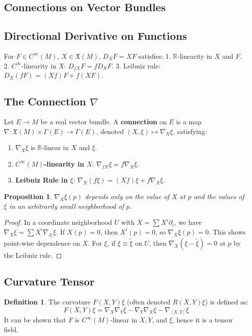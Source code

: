 \documentclass[11pt, a4paper]{article}
\theoremstyle{plain}
\newtheorem{proposition}[theorem]{Proposition}
\theoremstyle{definition}
\newtheorem{definition}[theorem]{Definition}
\theoremstyle{remark}
\begin{document}
\subsection{Connections on Vector Bundles}

\subsection*{Directional Derivative on Functions}
For $F \in C^\infty(M)$, $X \in \mathfrak{X}(M)$, $D_X F = XF$ satisfies:
1. $\mathbb{R}$-linearity in $X$ and $F$.
2. $C^\infty$-linearity in $X$: $D_{fX} F = f D_X F$.
3. Leibniz rule: $D_X(fF) = (Xf)F + f(XF)$.

\subsection*{The Connection $\nabla$}
Let $E \to M$ be a real vector bundle. A \textbf{connection} on $E$ is a map $\nabla: \mathfrak{X}(M) \times \Gamma(E) \to \Gamma(E)$, denoted $(X, \xi) \mapsto \nabla_X \xi$, satisfying:
\begin{enumerate}
    \item $\nabla_X \xi$ is $\mathbb{R}$-linear in $X$ and $\xi$.
    \item \textbf{$C^\infty(M)$-linearity in $X$}: $\nabla_{fX} \xi = f \nabla_X \xi$.
    \item \textbf{Leibniz Rule in $\xi$}: $\nabla_X(f\xi) = (Xf)\xi + f \nabla_X \xi$.
\end{enumerate}

\begin{proposition}
$\nabla_X \xi (p)$ depends only on the value of $X$ at $p$ and the values of $\xi$ in an arbitrarily small neighborhood of $p$.
\end{proposition}

\begin{proof}
In a coordinate neighborhood $U$ with $X = \sum X^i \partial_i$, we have $\nabla_X \xi = \sum X^i \nabla_{\partial_i} \xi$. If $X(p)=0$, then $X^i(p)=0$, so $\nabla_X \xi(p) = 0$. This shows point-wise dependence on $X$. For $\xi$, if $\xi \equiv \tilde{\xi}$ on $U$, then $\nabla_X (\xi - \tilde{\xi}) = 0$ at $p$ by the Leibniz rule.
\end{proof}

\subsection*{Curvature Tensor}
\begin{definition}
The curvature $F(X, Y)\xi$ (often denoted $R(X, Y)\xi$) is defined as:
\[ F(X, Y)\xi = \nabla_X \nabla_Y \xi - \nabla_Y \nabla_X \xi - \nabla_{[X, Y]} \xi \]
It can be shown that $F$ is $C^\infty(M)$-linear in $X, Y$, and $\xi$, hence it is a tensor field.
\end{definition}
\newpage
\end{document}
